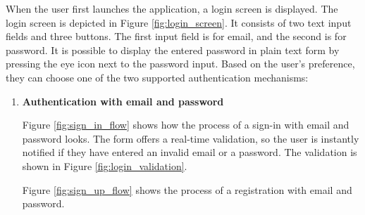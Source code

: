 \documentclass[
  printed, %
  table,   %
  oneside, %
  lof,     %
  lot,     %
]{fithesis3}
\begin{document}
When the user first launches the application, a login screen is displayed. The login screen is depicted in Figure \ref{fig:login_screen}. It consists of two text input fields and three buttons. The first input field is for email, and the second is for password. It is possible to display the entered password in plain text form by pressing the eye icon next to the password input. Based on the user's preference, they can choose one of the two supported authentication mechanisms:

\begin{enumerate}
    \item \textbf{Authentication with email and password}
    
    Figure \ref{fig:sign_in_flow} shows how the process of a sign-in with email and password looks. The form offers a real-time validation, so the user is instantly notified if they have entered an invalid email or a password. The validation is shown in Figure \ref{fig:login_validation}.
        
    Figure \ref{fig:sign_up_flow} shows the process of a registration with email and password.
    

\end{enumerate}
\end{document}
